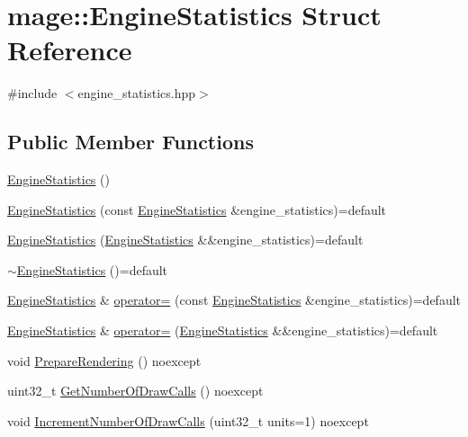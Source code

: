\hypertarget{structmage_1_1_engine_statistics}{}\section{mage\+:\+:Engine\+Statistics Struct Reference}
\label{structmage_1_1_engine_statistics}


{\ttfamily \#include $<$engine\+\_\+statistics.\+hpp$>$}

\subsection*{Public Member Functions}
\begin{DoxyCompactItemize}
\item 
\hyperlink{structmage_1_1_engine_statistics_acbaa39e0e0ee0d6cb5c8d174bb80a3fd}{Engine\+Statistics} ()
\item 
\hyperlink{structmage_1_1_engine_statistics_a8361fa991298c7669b4e3c8262acff60}{Engine\+Statistics} (const \hyperlink{structmage_1_1_engine_statistics}{Engine\+Statistics} \&engine\+\_\+statistics)=default
\item 
\hyperlink{structmage_1_1_engine_statistics_acb3eb7a8f16733d29b4a0e4490723cd5}{Engine\+Statistics} (\hyperlink{structmage_1_1_engine_statistics}{Engine\+Statistics} \&\&engine\+\_\+statistics)=default
\item 
\hyperlink{structmage_1_1_engine_statistics_a471f643061b881ae69cc807b34c48127}{$\sim$\+Engine\+Statistics} ()=default
\item 
\hyperlink{structmage_1_1_engine_statistics}{Engine\+Statistics} \& \hyperlink{structmage_1_1_engine_statistics_a6c5e8b9a5806e67f6f93a3c558293249}{operator=} (const \hyperlink{structmage_1_1_engine_statistics}{Engine\+Statistics} \&engine\+\_\+statistics)=default
\item 
\hyperlink{structmage_1_1_engine_statistics}{Engine\+Statistics} \& \hyperlink{structmage_1_1_engine_statistics_a4674d3856fee372e05f1bed017e46d5b}{operator=} (\hyperlink{structmage_1_1_engine_statistics}{Engine\+Statistics} \&\&engine\+\_\+statistics)=default
\item 
void \hyperlink{structmage_1_1_engine_statistics_a722912aa5e93caff589a52bb10be930d}{Prepare\+Rendering} () noexcept
\item 
uint32\+\_\+t \hyperlink{structmage_1_1_engine_statistics_ae583e788f11e419e05de47cbb01be279}{Get\+Number\+Of\+Draw\+Calls} () noexcept
\item 
void \hyperlink{structmage_1_1_engine_statistics_a2516bf8b3ee2b652ff34de0f36956809}{Increment\+Number\+Of\+Draw\+Calls} (uint32\+\_\+t units=1) noexcept
\end{DoxyCompactItemize}
